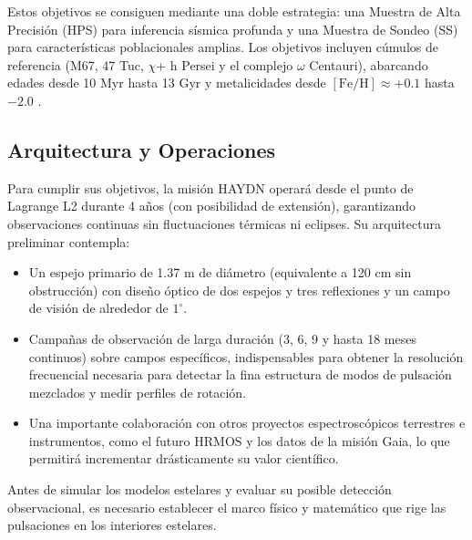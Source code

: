 Estos objetivos se consiguen mediante una doble estrategia: una Muestra de Alta Precisión (HPS) para inferencia sísmica profunda y una Muestra de Sondeo (SS) para características poblacionales amplias. Los objetivos incluyen cúmulos de referencia (M67, 47 Tuc, $\chi$+ h Persei y el complejo $\omega$ Centauri), abarcando edades desde 10 Myr hasta 13 Gyr y metalicidades desde $\mathrm{[Fe/H]} \approx +0.1$ hasta $-2.0$ \citep{haydn_mission_proposal_2026}.

\subsection{Arquitectura y Operaciones}

Para cumplir sus objetivos, la misión HAYDN operará desde el punto de Lagrange L2 durante 4 años (con posibilidad de extensión), garantizando observaciones continuas sin fluctuaciones térmicas ni eclipses. Su arquitectura preliminar contempla:

\begin{itemize}
  \item Un espejo primario de 1.37 m de diámetro (equivalente a 120 cm sin obstrucción) con diseño óptico de dos espejos y tres reflexiones y un campo de visión de alrededor de $1^\circ$.

  \item Campañas de observación de larga duración (3, 6, 9 y hasta 18 meses continuos) sobre campos específicos, indispensables para obtener la resolución frecuencial necesaria para detectar la fina estructura de modos de pulsación mezclados y medir perfiles de rotación.

  \item Una importante colaboración con otros proyectos espectroscópicos terrestres e instrumentos, como el futuro HRMOS y los datos de la misión Gaia, lo que permitirá incrementar drásticamente su valor científico.
\end{itemize}

\vspace{1cm}
Antes de simular los modelos estelares y evaluar su posible detección observacional, es necesario establecer el marco físico y matemático que rige las pulsaciones en los interiores estelares.